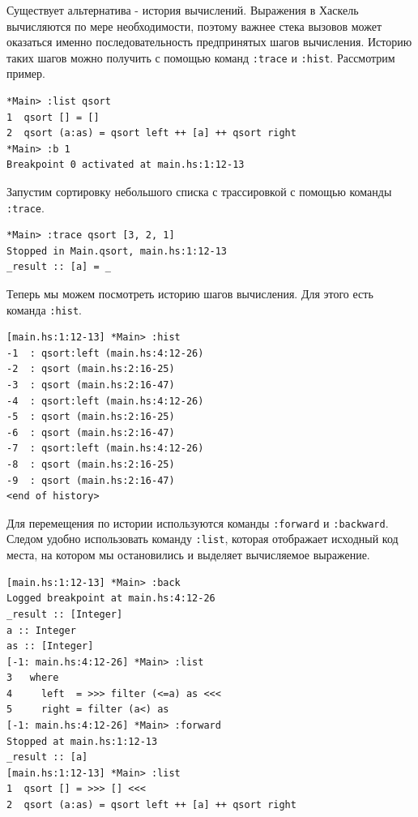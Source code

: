 \documentclass[fontsize=14pt, paper=a4, pagesize, DIV=calc]{scrartcl}
\def\code#1{\texttt{#1}}
\begin{document}
Существует альтернатива - история вычислений. Выражения в Хаскель вычисляются
по мере необходимости, поэтому важнее стека вызовов может оказаться именно
последовательность предпринятых шагов вычисления. Историю таких шагов можно
получить с помощью команд \code{:trace} и \code{:hist}. Рассмотрим пример.

\begin{ListingEnv}
\caption{}
\begin{lstlisting}
*Main> :list qsort
1  qsort [] = []
2  qsort (a:as) = qsort left ++ [a] ++ qsort right
*Main> :b 1
Breakpoint 0 activated at main.hs:1:12-13
\end{lstlisting}
\end{ListingEnv}

Запустим сортировку небольшого списка с трассировкой с помощью команды \code{:trace}.

\begin{ListingEnv}
\caption{}
\begin{lstlisting}
*Main> :trace qsort [3, 2, 1]
Stopped in Main.qsort, main.hs:1:12-13
_result :: [a] = _
\end{lstlisting}
\end{ListingEnv}

Теперь мы можем посмотреть историю шагов вычисления. Для этого есть команда
\code{:hist}.

\begin{ListingEnv}
\caption{}
\begin{lstlisting}
[main.hs:1:12-13] *Main> :hist
-1  : qsort:left (main.hs:4:12-26)
-2  : qsort (main.hs:2:16-25)
-3  : qsort (main.hs:2:16-47)
-4  : qsort:left (main.hs:4:12-26)
-5  : qsort (main.hs:2:16-25)
-6  : qsort (main.hs:2:16-47)
-7  : qsort:left (main.hs:4:12-26)
-8  : qsort (main.hs:2:16-25)
-9  : qsort (main.hs:2:16-47)
<end of history> 
\end{lstlisting}
\end{ListingEnv}

Для перемещения по истории используются команды \code{:forward} и
\code{:backward}. Следом удобно использовать команду \code{:list}, которая
отображает исходный код места, на котором мы остановились и выделяет 
вычисляемое выражение.

\begin{ListingEnv}
\caption{}
\begin{lstlisting}
[main.hs:1:12-13] *Main> :back
Logged breakpoint at main.hs:4:12-26
_result :: [Integer]
a :: Integer
as :: [Integer]
[-1: main.hs:4:12-26] *Main> :list
3   where
4     left  = >>> filter (<=a) as <<<
5     right = filter (a<) as
[-1: main.hs:4:12-26] *Main> :forward
Stopped at main.hs:1:12-13
_result :: [a]
[main.hs:1:12-13] *Main> :list
1  qsort [] = >>> [] <<<
2  qsort (a:as) = qsort left ++ [a] ++ qsort right
\end{lstlisting}
\end{ListingEnv}
\end{document}
